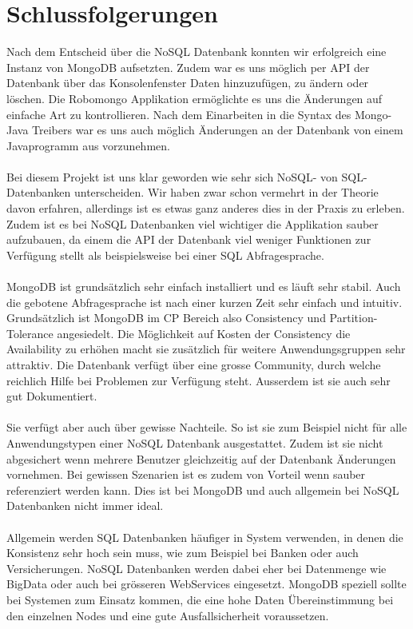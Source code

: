 \section{Schlussfolgerungen}
Nach dem Entscheid über die NoSQL Datenbank konnten wir erfolgreich eine Instanz
von MongoDB aufsetzten. Zudem war es uns möglich per API der Datenbank über das
Konsolenfenster Daten hinzuzufügen, zu ändern oder löschen. Die
Robomongo\cite{Robomongo2016} Applikation ermöglichte es uns die Änderungen auf
einfache Art zu kontrollieren. Nach dem Einarbeiten in die Syntax des Mongo-Java Treibers war es uns auch möglich Änderungen an der Datenbank von einem Javaprogramm aus vorzunehmen.
\\\\
Bei diesem Projekt ist uns klar geworden wie sehr sich NoSQL- von SQL-Datenbanken unterscheiden. Wir haben zwar schon vermehrt in der Theorie davon erfahren, allerdings ist es etwas ganz anderes dies in der Praxis zu erleben. Zudem ist es bei NoSQL Datenbanken viel wichtiger die Applikation sauber aufzubauen, da einem die API der Datenbank viel weniger Funktionen zur Verfügung stellt als beispielsweise bei einer SQL Abfragesprache. 
\\\\
MongoDB ist grundsätzlich sehr einfach installiert und es läuft sehr stabil. Auch die gebotene Abfragesprache ist nach einer kurzen Zeit sehr einfach und intuitiv. Grundsätzlich ist MongoDB im CP Bereich also Consistency und Partition-Tolerance angesiedelt. Die Möglichkeit auf Kosten der Consistency die Availability zu erhöhen macht sie zusätzlich für weitere Anwendungsgruppen sehr attraktiv. Die Datenbank verfügt über eine grosse Community, durch welche reichlich Hilfe bei Problemen zur Verfügung steht. Ausserdem ist sie auch sehr gut Dokumentiert.
\\\\
Sie verfügt aber auch über gewisse Nachteile. So ist sie zum Beispiel nicht für alle Anwendungstypen einer NoSQL Datenbank ausgestattet. Zudem ist sie nicht abgesichert wenn mehrere Benutzer gleichzeitig auf der Datenbank Änderungen vornehmen. Bei gewissen Szenarien ist es zudem von Vorteil wenn sauber referenziert werden kann. Dies ist bei MongoDB und auch allgemein bei NoSQL Datenbanken nicht immer ideal.
\\\\
Allgemein werden SQL Datenbanken häufiger in System verwenden, in denen die Konsistenz sehr hoch sein muss, wie zum Beispiel bei Banken oder auch Versicherungen. NoSQL Datenbanken werden dabei eher bei Datenmenge wie BigData oder auch bei grösseren WebServices eingesetzt. MongoDB speziell sollte bei Systemen zum Einsatz kommen, die eine hohe Daten Übereinstimmung bei den einzelnen Nodes und eine gute Ausfallsicherheit voraussetzen.

